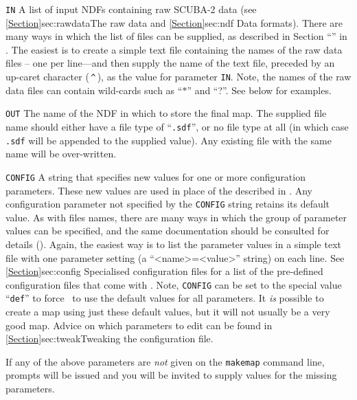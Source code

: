 \begin{aligndesc}
\item[\texttt{IN}] A list of input NDFs containing raw SCUBA-2 data (see
\cref{Section}{sec:rawdata}{The raw data} and \cref{Section}{sec:ndf}
{Data formats}). There are many ways in which the list of files can be supplied,
as described in Section ``''
in . The easiest is to create a simple text
file containing the names of the raw data files -- one per line---and
then supply the name of the text file, preceded by an up-caret character
(\,\texttt{\^{}}\,), as the value for parameter \texttt{IN}. Note, the names of
the raw data files can contain wild-cards such as ``$*$'' and ``?''.
See below for examples.

\item[\texttt{OUT}] The name of the NDF in which to store the final
map. The supplied file name should either have a file type of
``\texttt{.sdf}'', or no file type at all (in which case \texttt{.sdf}
will be appended to the supplied value). Any existing file with the same
name will be over-written.

\item[\texttt{CONFIG}] A string that specifies new values for one or more
configuration parameters. These new values are used in place of the
 described in
. Any configuration parameter not specified by
the \texttt{CONFIG} string retains its default value. As with files
names, there are many ways in which the group of parameter values can be
specified, and the same documentation should be consulted for details
(). Again, the easiest way is to list the
parameter values in a simple text file with one parameter setting (a
``<name>=<value>'' string) on each line. See \cref{Section}{sec:config}
{Specialised configuration files} for a list of the pre-defined
configuration files that come with \smurf. Note, \texttt{CONFIG}
can be set to the special value ``\texttt{def}'' to force \makemap\ to
use the default values for all parameters. It \emph{is} possible to create
a map using just these default values, but it will not usually be a very
good map. Advice on which parameters to edit can be found in
\cref{Section}{sec:tweak}{Tweaking the configuration file}.

\end{aligndesc}

If any of the above parameters are \emph{not} given on the \texttt{makemap}
command line, prompts will be issued and you will be invited to supply values
for the missing parameters.

